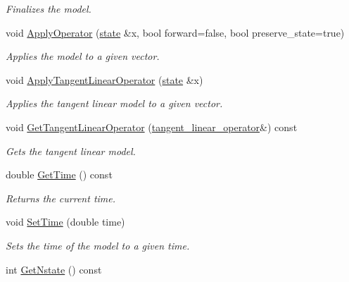 \documentclass{tufte-book}
\begin{document}
\begin{DoxyCompactItemize}
\begin{DoxyCompactList}\small\item\em \-Finalizes the model. \end{DoxyCompactList}\item
void \hyperlink{class_verdandi_1_1_model_template_a51ccbc28bb54012db77988d62fc3a070}{\-Apply\-Operator} (\hyperlink{class_verdandi_1_1_model_template_a6bb9efb7898f067bb21780159b497ba7}{state} \&x, bool forward=false, bool preserve\-\_\-state=true)
\begin{DoxyCompactList}\small\item\em \-Applies the model to a given vector. \end{DoxyCompactList}\item
void \hyperlink{class_verdandi_1_1_model_template_ad0dac987004be92a6b66032c82122bb8}{\-Apply\-Tangent\-Linear\-Operator} (\hyperlink{class_verdandi_1_1_model_template_a6bb9efb7898f067bb21780159b497ba7}{state} \&x)
\begin{DoxyCompactList}\small\item\em \-Applies the tangent linear model to a given vector. \end{DoxyCompactList}\item
void \hyperlink{class_verdandi_1_1_model_template_a64074bf180b5170923d31019d3987132}{\-Get\-Tangent\-Linear\-Operator} (\hyperlink{class_verdandi_1_1_model_template_a014f883415120d5ba6655c710467a651}{tangent\-\_\-linear\-\_\-operator}\&) const
\begin{DoxyCompactList}\small\item\em \-Gets the tangent linear model. \end{DoxyCompactList}\item
double \hyperlink{class_verdandi_1_1_model_template_a72c2c923640d73406675dec9898b6548}{\-Get\-Time} () const
\begin{DoxyCompactList}\small\item\em \-Returns the current time. \end{DoxyCompactList}\item
void \hyperlink{class_verdandi_1_1_model_template_a815893e2e04bc0593ec3552c9c8d59b4}{\-Set\-Time} (double time)
\begin{DoxyCompactList}\small\item\em \-Sets the time of the model to a given time. \end{DoxyCompactList}\item
int \hyperlink{class_verdandi_1_1_model_template_a44b42fdd4448173cbcb8c2b64733e534}{\-Get\-Nstate} () const

\end{DoxyCompactItemize}
\end{document}
